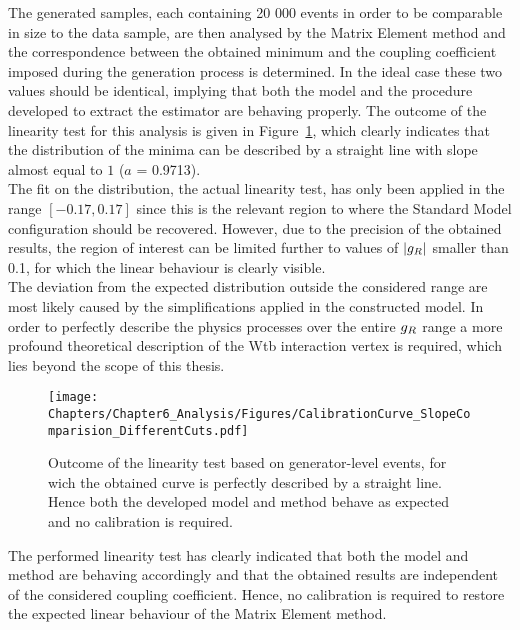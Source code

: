 The generated samples, each containing 20 000 events in order to be comparable in size to the data sample, are then analysed by the Matrix Element method and the correspondence between the obtained minimum and the coupling coefficient imposed during the generation process is determined. 
In the ideal case these two values should be identical, implying that both the model and the procedure developed to extract the estimator are behaving properly.
The outcome of the linearity test for this analysis is given in Figure~\ref{fig::CalibCurve}, which clearly indicates that the distribution of the minima can be described by a straight line with slope almost equal to $1$ ($a$ = 0.9713).
\\
The fit on the distribution, the actual linearity test, has only been applied in the range $\left[-0.17, 0.17\right]$ since this is the relevant region to where the Standard Model configuration should be recovered. However, due to the precision of the obtained results, the region of interest can be limited further to values of $\vert g_{R} \vert$ smaller than 0.1, for which the linear behaviour is clearly visible.
\\
The deviation from the expected distribution outside the considered range are most likely caused by the simplifications applied in the constructed model. In order to perfectly describe the physics processes over the entire $g_{R}$ range a more profound theoretical description of the Wtb interaction vertex is required, which lies beyond the scope of this thesis.
\begin{figure}[h!t]
 \centering
 \texttt{[image: Chapters/Chapter6\_Analysis/Figures/CalibrationCurve\_SlopeComparision\_DifferentCuts.pdf]}
 \caption{Outcome of the linearity test based on generator-level events, for wich the obtained curve is perfectly described by a straight line. Hence both the developed model and method behave as expected and no calibration is required.} \label{fig::CalibCurve}
\end{figure}
%

The performed linearity test has clearly indicated that both the model and method are behaving accordingly and that the obtained results are independent of the considered coupling coefficient.
Hence, no calibration is required to restore the expected linear behaviour of the Matrix Element method.

